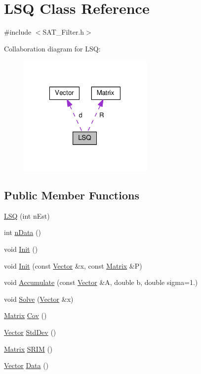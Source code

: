 \hypertarget{classLSQ}{\section{L\-S\-Q Class Reference}
\label{classLSQ}
}


{\ttfamily \#include $<$S\-A\-T\-\_\-\-Filter.\-h$>$}



Collaboration diagram for L\-S\-Q\-:\nopagebreak
\begin{figure}[H]
\begin{center}
\leavevmode
\includegraphics[width=187pt]{classLSQ__coll__graph}
\end{center}
\end{figure}
\subsection*{Public Member Functions}
\begin{DoxyCompactItemize}
\item 
\hyperlink{classLSQ_a07c17e3f379fb18c8a5c4c197495834a}{L\-S\-Q} (int n\-Est)
\item 
int \hyperlink{classLSQ_afa6fe2b1d00b6ef2ced1089426d6c668}{n\-Data} ()
\item 
void \hyperlink{classLSQ_a77940543ea83db4f557cdf09f99b3098}{Init} ()
\item 
void \hyperlink{classLSQ_a5a2fdaddfaeaf4638bfaafc25a6ae793}{Init} (const \hyperlink{classVector}{Vector} \&x, const \hyperlink{classMatrix}{Matrix} \&P)
\item 
void \hyperlink{classLSQ_aa98a7935493ef8e5cfc6f21cb6920307}{Accumulate} (const \hyperlink{classVector}{Vector} \&A, double b, double sigma=1.)
\item 
void \hyperlink{classLSQ_a5b632b4a83ac67ec22c176c9fd2242da}{Solve} (\hyperlink{classVector}{Vector} \&x)
\item 
\hyperlink{classMatrix}{Matrix} \hyperlink{classLSQ_a1747470db996bda1d339df70088c463a}{Cov} ()
\item 
\hyperlink{classVector}{Vector} \hyperlink{classLSQ_a735f9e8d4c4028b1e49e00ef0da87f97}{Std\-Dev} ()
\item 
\hyperlink{classMatrix}{Matrix} \hyperlink{classLSQ_ac9ba1dce0da84246d9b7cbf7f4165f00}{S\-R\-I\-M} ()
\item 
\hyperlink{classVector}{Vector} \hyperlink{classLSQ_a4f2cb1ea1dfe7775d252adbee57a23fd}{Data} ()
\end{DoxyCompactItemize}
